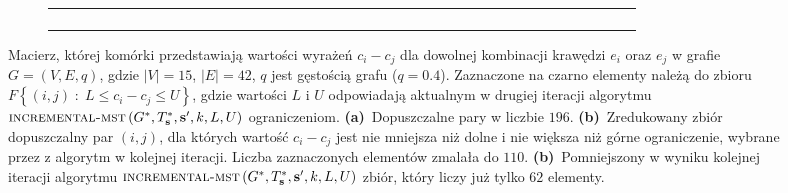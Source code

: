 \begin{figure}[!htbp]
\begin{subfigure}[b]{0.3\textwidth}
{\begin{tabu}{|c|c|c|c|c|c|c|c|c|c|c|c|c|c|c|c|c|c|c|c|c|c|c|c|c|c|c|c|c|c|c|c|c|c|c|c|c|c|c|c|c|c|}
				& & & & & & & & & & & & & & & & & & & & & & & & & & & & & & & & & & & & & & & & & \\\hline
				& & \cellcolor{black}	& & 	& & 	& & 	& & & & & & & & & & & & & \cellcolor{black}	& 	& & & 	& & 	& & & 	& & 	& 	& 	& & 	& & & & & 	\\\hline
				& & & & & & & & & & & & & & & & & & & & & & & & & & & & & & & & & & & & & & & & & \\\hline
				& & & & & & & & & & & & & & & & & & & & & & & & & & & & & & & & & & & & & & & & & \\\hline
				& & & & & & & & & & & & & & & & & & & & & & & & & & & & & & & & & & & & & & & & & \\\hline
			\end{tabu}%
		}
		\caption{}
		\label{fig:imstSeed2:c}
	\end{subfigure}
	\hfill\null
	\caption{
		Macierz, której komórki przedstawiają wartości wyrażeń $c_{i} - c_{j}$ dla dowolnej kombinacji krawędzi $e_{i}$ oraz $e_{j}$ w grafie $G = \left( V, E, q \right)$, gdzie $\left| V \right| = 15$, $\left| E \right| = 42$, $q$ jest gęstością grafu ($q = 0.4$). Zaznaczone na czarno elementy należą do zbioru $F \left\{ \left( i, j \right) \; : \; L \leqslant c_{i} - c_{j} \leqslant U \right\}$, gdzie wartości $L$ i $U$ odpowiadają aktualnym w drugiej iteracji algorytmu $\textsc{incremental-mst} \left( G^{\ast}, T^{\ast}_{\textbf{s}}, \textbf{s}^{\prime}, k, L, U \right)$ ograniczeniom.
		\textbf{(a)}~Dopuszczalne pary  w liczbie $196$.
		\textbf{(b)}~Zredukowany zbiór dopuszczalny par $\left( i, j \right)$, dla których wartość $c_{i} - c_{j}$ jest nie mniejsza niż dolne i nie większa niż górne ograniczenie, wybrane przez z algorytm w kolejnej iteracji. Liczba zaznaczonych elementów zmalała do $110$.
		\textbf{(b)}~Pomniejszony w wyniku kolejnej iteracji algorytmu $\textsc{incremental-mst} \left( G^{\ast}, T^{\ast}_{\textbf{s}}, \textbf{s}^{\prime}, k, L, U \right)$ zbiór, który liczy już tylko $62$ elementy.
	}
	\label{fig:imstSeed2}
\end{figure}

